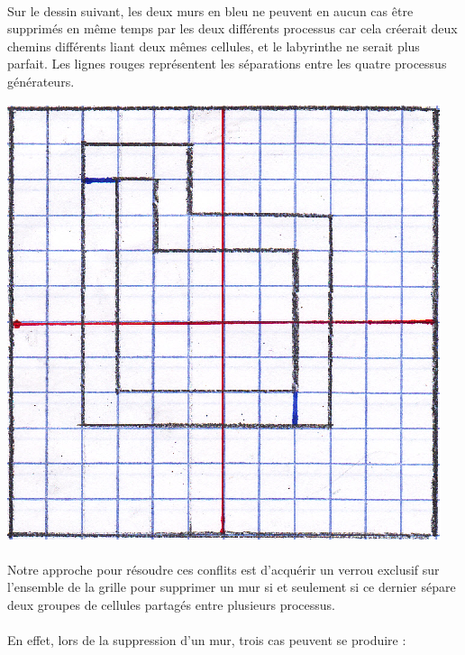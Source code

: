 \documentclass[a4paper,french]{article}
\begin{document}
    \paragraph{} Sur le dessin suivant, les deux murs en bleu ne peuvent en aucun
cas être supprimés en même temps par les deux différents processus car cela
créerait deux chemins différents liant deux mêmes cellules, et le labyrinthe ne
serait plus parfait. Les lignes rouges représentent les séparations entre les
quatre processus générateurs.

    \begin{center}
        \includegraphics{schema_conflit.eps}
    \end{center}

    \paragraph{} Notre approche pour résoudre ces conflits est d'acquérir un
verrou exclusif sur l'ensemble de la grille pour supprimer un mur si et
seulement si ce dernier sépare deux groupes de cellules partagés entre plusieurs
processus.

    \paragraph{} En effet, lors de la suppression d'un mur, trois cas peuvent se
produire :
\end{document}
